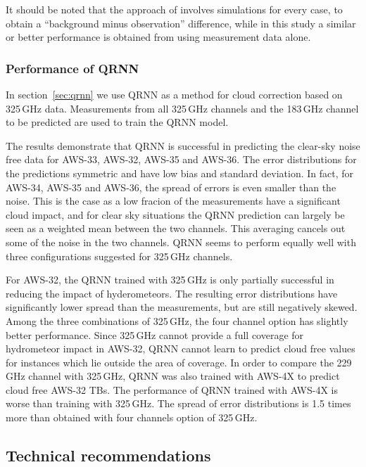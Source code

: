 \documentclass[12pt]{article}
\begin{document}
It should be noted that the approach of \citet{rekha2012potential} involves
simulations for every case, to obtain a ``background minus observation''
difference, while in this study a similar or better performance is obtained
from using measurement data alone. 

\subsubsection{Performance of QRNN}
In section~\ref{sec:qrnn} we use QRNN as a method for cloud correction based on
325\,GHz data. Measurements from all 325\,GHz channels and the 183\,GHz channel
to be predicted are used to train the QRNN model.

The results demonstrate that QRNN is successful in predicting the clear-sky
noise free data for AWS-33, AWS-32, AWS-35 and AWS-36. The error distributions
for the predictions symmetric and have low bias and standard deviation. In
fact, for AWS-34, AWS-35 and AWS-36, the spread of errors is even smaller than
the noise. This is the case as a low fracion of the measurements have a
significant cloud impact, and for clear sky situations the QRNN prediction can
largely be seen as a weighted mean between the two channels. This averaging
cancels out some of the noise in the two channels. QRNN seems to perform
equally well with three configurations suggested for 325\,GHz channels.

For AWS-32, the QRNN trained with 325\,GHz is only partially successful in
reducing the impact of hyderometeors. The resulting error distributions have
significantly lower spread than the measurements, but are still negatively
skewed. Among the three combinations of 325\,GHz, the four channel option has
slightly better performance. Since 325\,GHz cannot provide a full coverage for
hydrometeor impact in AWS-32, QRNN cannot learn to predict cloud free values
for instances which lie outside the area of coverage. In order to compare the
229\,GHz channel with 325\,GHz, QRNN was also trained with AWS-4X to predict
cloud free AWS-32 TBs. The performance of QRNN trained with AWS-4X is worse
than training with 325\,GHz. The spread of error distributions is 1.5 times
more than obtained with four channels option of 325\,GHz.



\subsection{Technical recommendations}
%
\end{document}
